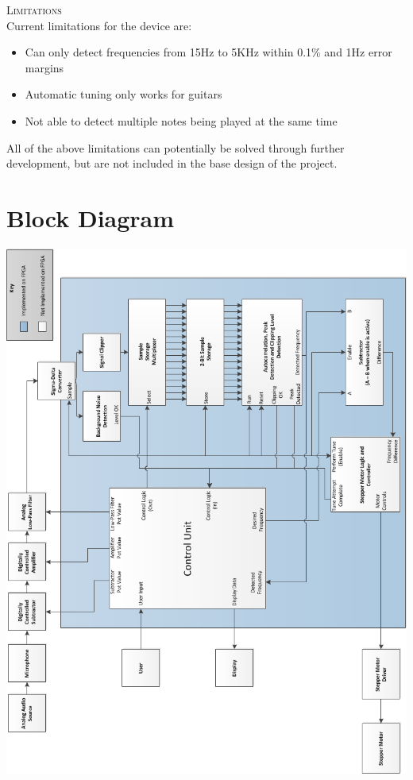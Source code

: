 \documentclass[aps,letterpaper,10pt]{revtex4}
\begin{document}
\noindent \textsc{\large Limitations}\\

Current limitations for the device are:
\begin{itemize}
\item Can only detect frequencies from 15Hz to 5KHz within 0.1\% and 1Hz error margins
\item Automatic tuning only works for guitars
\item Not able to detect multiple notes being played at the same time
\end{itemize}
All of the above limitations can potentially be solved through further development, but are not included in the base design of the project. 

\newpage
\section{Block Diagram}
\includegraphics[width=\textwidth]{EE119c_block_diagram.png}
\end{document}
